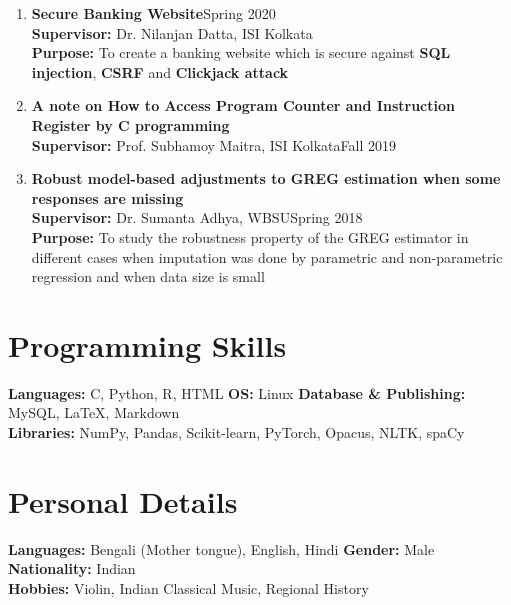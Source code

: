 \documentclass[margin,line]{res}
\begin{document}
\begin{resume}
\begin{enumerate}
\item {\bf Secure Banking Website}\hfill{Spring 2020}\\
\textbf{Supervisor:} Dr. Nilanjan Datta, ISI Kolkata\\
\textbf{Purpose:} To create a banking website which is secure against \textbf{SQL injection}, \textbf{CSRF} and \textbf{Clickjack attack}

\item {\bf A note on How to Access Program Counter and Instruction Register by C programming}\\
\textbf{Supervisor:} Prof. Subhamoy Maitra, ISI Kolkata\hfill{Fall 2019}

\item {\bf Robust model-based adjustments to GREG estimation when some responses are missing}\\
\textbf{Supervisor:} Dr. Sumanta Adhya, WBSU\hfill{Spring 2018}\\
\textbf{Purpose:} To study the robustness property of the GREG estimator in different cases when imputation was done by parametric and non-parametric regression and when data size is small
\end{enumerate}

\section{\sc Programming Skills}
\textbf{Languages:} C, Python, R, HTML \quad
\textbf{OS:} Linux \quad
\textbf{Database \& Publishing:} MySQL, \LaTeX, Markdown\\
\textbf{Libraries:} NumPy, Pandas, Scikit-learn, PyTorch, Opacus, NLTK, spaCy

\section{\sc Personal Details}
\textbf{Languages:} Bengali (Mother tongue), English, Hindi \quad
\textbf{Gender:} Male \quad
\textbf{Nationality:} Indian\\
\textbf{Hobbies:} Violin, Indian Classical Music, Regional History

\end{resume}
\end{document}
